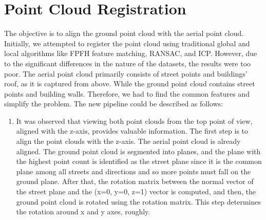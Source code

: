 \documentclass[11pt]{article}
\begin{document}
    \section{Point Cloud Registration}
    The objective is to align the ground point cloud with the aerial point cloud. Initially, we attempted
    to register the point cloud using traditional global and local algorithms like FPFH feature matching,
    RANSAC, and ICP. However, due to the significant differences in the nature of the datasets, the results were
    too poor. The aerial point cloud primarily consists of street points and buildings' roof, as it is captured
    from above. While the ground point cloud contains street points and building walls. Therefore, we had to
    find the common features and simplify the problem. The new pipeline could be described as follows:
    \begin{enumerate}
        \item It was observed that viewing both point clouds from the top point of view, aligned with the z-axis, provides
        valuable information. The first step is to align the point clouds with the z-axis. The aerial
        point cloud is already aligned. The ground point cloud is segmented into planes, and the plane
        with the highest point count is identified as the street plane since it is the common plane among
        all streets and directions and so more points must fall on the ground plane. After that,
        the rotation matrix between the normal vector of the street plane and the (x=0, y=0, z=1) vector
        is computed, and then, the ground point cloud is rotated using the rotation matrix.
        This step determines the rotation around x and y axes, roughly.


\end{enumerate}
\end{document}
